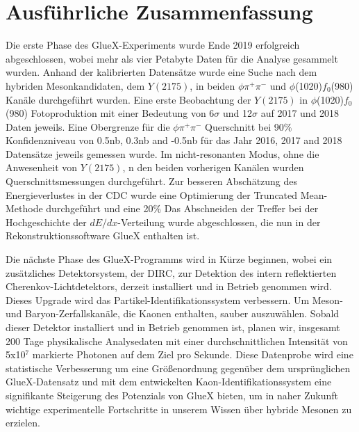 \chapter{Ausf\"uhrliche Zusammenfassung}
\label{zusammen}

Die erste Phase des GlueX-Experiments wurde Ende 2019 erfolgreich abgeschlossen, wobei mehr als vier Petabyte Daten f\"ur die Analyse gesammelt wurden. Anhand der kalibrierten Datens\"atze wurde eine Suche nach dem hybriden Mesonkandidaten, dem $Y(2175)$, in beiden $\phi\pi^{+}\pi^{-}$ und $\phi$(1020)$f_0$(980) Kan\"ale durchgef\"uhrt wurden. Eine erste Beobachtung der $Y(2175)$ in $\phi$(1020)$f_0$(980) Fotoproduktion mit einer Bedeutung von 6$\sigma$ und 12$\sigma$ auf 2017 und 2018 Daten jeweils. Eine Obergrenze f\"ur die $\phi\pi^{+}\pi^{-}$ Querschnitt bei 90$\%$ Konfidenzniveau von 0.5nb, 0.3nb and -0.5nb f\"ur das Jahr 2016, 2017 and 2018 Datens\"atze jeweils gemessen wurde. Im nicht-resonanten Modus, ohne die Anwesenheit von $Y(2175)$, n den beiden vorherigen Kan\"alen wurden Querschnittsmessungen durchgef\"uhrt. Zur besseren Absch\"atzung des Energieverlustes in der CDC wurde eine Optimierung der Truncated Mean-Methode durchgef\"uhrt und eine 20$\%$ Das Abschneiden der Treffer bei der Hochgeschichte der $dE/dx$-Verteilung wurde abgeschlossen, die nun in der Rekonstruktionssoftware GlueX enthalten ist.
~\par Die n\"achste Phase des GlueX-Programms wird in K\"urze beginnen, wobei ein zus\"atzliches Detektorsystem, der DIRC, zur Detektion des intern reflektierten Cherenkov-Lichtdetektors, derzeit installiert und in Betrieb genommen wird. Dieses Upgrade wird das Partikel-Identifikationssystem verbessern. Um Meson- und Baryon-Zerfallskan\"ale, die Kaonen enthalten, sauber auszuw\"ahlen. Sobald dieser Detektor installiert und in Betrieb genommen ist, planen wir, insgesamt 200 Tage physikalische Analysedaten mit einer durchschnittlichen Intensit\"at von 5x10$^7$ markierte Photonen auf dem Ziel pro Sekunde. Diese Datenprobe wird eine statistische Verbesserung um eine Gr\"o{\ss}enordnung gegen\"uber dem urspr\"unglichen GlueX-Datensatz und mit dem entwickelten Kaon-Identifikationssystem eine signifikante Steigerung des Potenzials von GlueX bieten, um in naher Zukunft wichtige experimentelle Fortschritte in unserem Wissen \"uber hybride Mesonen zu erzielen.